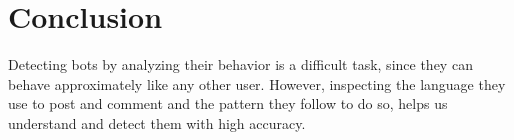 \documentclass{article}
\begin{document}
 
 \section{Conclusion}
 Detecting bots by analyzing their behavior is a difficult task, since they can behave approximately like any other user. However, inspecting the language they use to post and comment and the pattern they follow to do so, helps us understand and detect them with high accuracy.
\end{document}
